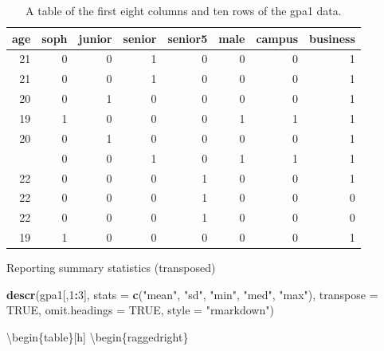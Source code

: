 \documentclass[]{book}
\newenvironment{Shaded}{\begin{snugshade}}{\end{snugshade}}
\newcommand{\DataTypeTok}[1]{\textcolor[rgb]{0.13,0.29,0.53}{#1}}
\newcommand{\DecValTok}[1]{\textcolor[rgb]{0.00,0.00,0.81}{#1}}
\newcommand{\KeywordTok}[1]{\textcolor[rgb]{0.13,0.29,0.53}{\textbf{#1}}}
\newcommand{\NormalTok}[1]{#1}
\newcommand{\OperatorTok}[1]{\textcolor[rgb]{0.81,0.36,0.00}{\textbf{#1}}}
\newcommand{\OtherTok}[1]{\textcolor[rgb]{0.56,0.35,0.01}{#1}}
\newcommand{\StringTok}[1]{\textcolor[rgb]{0.31,0.60,0.02}{#1}}
\begin{document}
\begin{table}

\caption{\label{tab:unnamed-chunk-81}A table of the first eight columns and ten rows of the gpa1 data.}
\centering
\begin{tabular}[t]{rrrrrrrr}
\toprule
age & soph & junior & senior & senior5 & male & campus & business\\
\midrule
21 & 0 & 0 & 1 & 0 & 0 & 0 & 1\\
21 & 0 & 0 & 1 & 0 & 0 & 0 & 1\\
20 & 0 & 1 & 0 & 0 & 0 & 0 & 1\\
19 & 1 & 0 & 0 & 0 & 1 & 1 & 1\\
20 & 0 & 1 & 0 & 0 & 0 & 0 & 1\\
\addlinespace
20 & 0 & 0 & 1 & 0 & 1 & 1 & 1\\
22 & 0 & 0 & 0 & 1 & 0 & 0 & 1\\
22 & 0 & 0 & 0 & 1 & 0 & 0 & 0\\
22 & 0 & 0 & 0 & 1 & 0 & 0 & 0\\
19 & 1 & 0 & 0 & 0 & 0 & 0 & 1\\
\bottomrule
\end{tabular}
\end{table}

Reporting summary statistics (transposed)

\begin{Shaded}
\begin{Highlighting}[]
\KeywordTok{descr}\NormalTok{(gpa1[,}\DecValTok{1}\OperatorTok{:}\DecValTok{3}\NormalTok{], }\DataTypeTok{stats =} \KeywordTok{c}\NormalTok{(}\StringTok{"mean"}\NormalTok{, }\StringTok{"sd"}\NormalTok{, }\StringTok{"min"}\NormalTok{, }\StringTok{"med"}\NormalTok{, }\StringTok{"max"}\NormalTok{), }\DataTypeTok{transpose =} \OtherTok{TRUE}\NormalTok{, }
      \DataTypeTok{omit.headings =} \OtherTok{TRUE}\NormalTok{, }\DataTypeTok{style =} \StringTok{"rmarkdown"}\NormalTok{)}
\end{Highlighting}
\end{Shaded}

\textbackslash{}begin\{table\}{[}h{]}
\textbackslash{}begin\{raggedright\}
\end{document}
